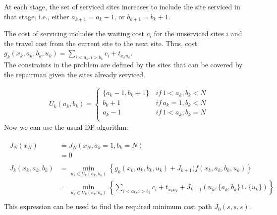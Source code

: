 \documentclass[11pt, oneside]{article}   	%
\begin{document}
At each stage, the set of serviced sites increases to include the site serviced in that stage, i.e., either $a_{k+1} = a_k -1$, or $b_{k+1} = b_k +1$.

The cost of servicing includes the waiting cost $c_i$ for the unserviced sites $i$ and the travel cost from the current site to the next site.
Thus, cost: $g_k(x_k, a_k, b_k, u_k)=\sum_{i<a_k, i>b_k}c_i + t_{x_k u_k}$.\\

The constraints in the problem are defined by the sites that can be covered by the repairman given the sites already serviced.

\begin{align*}
U_{k}(a_{k},b_{k}) =
\begin{cases}
	\{a_{k}-1, b_k +1 \}  \, & if \, 1 < a_k, b_k < N \\
	 b_k + 1 \, & if \, a_{k}=1,b_{k} < N\\
	 a_k - 1  \, & if \, 1 < a_{k},b_{k}=N\\
\end{cases}
\end{align*}
Now we can use the usual DP algorithm:

\begin{align}
\begin{split}
J_{N}(x_{N}) &= J_N (x_{N}, a_k =1, b_k = N)\\
&= 0\\
\\
J_k(x_k, a_k, b_k) &= \min_{u_k \in U_k(a_k, b_k)} \left\{g_k(x_k,a_k,b_k,u_k) + J_{k+1} (f(x_k, a_k, b_k, u_k) \right\}\\
&= \min_{u_k \in U_k(a_k, b_k)} \left\{ \sum_{i<a_k, i>b_k}c_i + t_{x_k u_k} + J_{k+1} (u_k, \{a_k, b_k\} \cup \{u_k\}) \right\}\\
\end{split}
\end{align}
This expression can be used to find the required minimum cost path $J_0(s,s,s)$.
\end{document}
